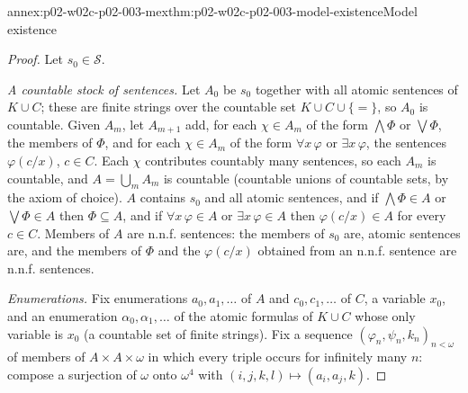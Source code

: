 \begin{annexitem}{annex:p02-w02c-p02-003-mex}{thm:p02-w02c-p02-003-model-existence}{Model existence}
\begin{proof}
Let \(s_0\in\mathcal S\).

\emph{A countable stock of sentences.}  Let \(A_0\) be \(s_0\) together
with all atomic sentences of \(K\cup C\); these are finite strings over
the countable set \(K\cup C\cup\{=\}\), so \(A_0\) is countable.  Given
\(A_m\), let \(A_{m+1}\) add, for each \(\chi\in A_m\) of the form
\(\bigwedge\Phi\) or \(\bigvee\Phi\), the members of \(\Phi\), and for each
\(\chi\in A_m\) of the form \(\forall x\,\varphi\) or \(\exists
x\,\varphi\), the sentences \(\varphi(c/x)\), \(c\in C\).  Each \(\chi\)
contributes countably many sentences, so each \(A_m\) is countable, and
\(A=\bigcup_m A_m\) is countable (countable unions of countable sets, by
the axiom of choice).  \(A\) contains \(s_0\) and all atomic sentences, and
if \(\bigwedge\Phi\in A\) or \(\bigvee\Phi\in A\) then \(\Phi\subseteq A\),
and if \(\forall x\,\varphi\in A\) or \(\exists x\,\varphi\in A\) then
\(\varphi(c/x)\in A\) for every \(c\in C\).  Members of \(A\) are n.n.f.
sentences: the members of \(s_0\) are, atomic sentences are, and the
members of \(\Phi\) and the \(\varphi(c/x)\) obtained from an n.n.f.
sentence are n.n.f. sentences.

\emph{Enumerations.}  Fix enumerations \(a_0,a_1,\ldots\) of \(A\) and
\(c_0,c_1,\ldots\) of \(C\), a variable \(x_0\), and an enumeration
\(\alpha_0,\alpha_1,\ldots\) of the atomic formulas of \(K\cup C\) whose
only variable is \(x_0\) (a countable set of finite strings).  Fix a
sequence \((\varphi_n,\psi_n,k_n)_{n<\omega}\) of members of
\(A\times A\times\omega\) in which every triple occurs for infinitely many
\(n\): compose a surjection of \(\omega\) onto \(\omega^{4}\) with
\((i,j,k,l)\mapsto(a_i,a_j,k)\).


\end{proof}
\end{annexitem}
